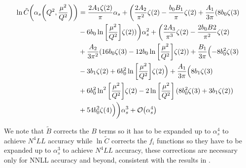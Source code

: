 \documentclass[../main.tex]{subfiles}
\begin{document}

\begin{align}
    \begin{split}
    \ln \tilde{C}\qty(\alpha_s \qty(Q^2, \frac{\mu^2}{Q^2})) &= \frac{2 A_1 \zeta(2)}{\pi} \alpha_s + \biggl(\frac{2 A_2}{\pi^2} \zeta(2) - \frac{b_0 B_1}{\pi} \zeta(2) + \frac{A_1}{3\pi}(8 b_0 \zeta(3) \\
    &- 6 b_0 \ln\qty[\frac{\mu^2}{Q^2}] \zeta(2))\biggr)\alpha_s^2 + \biggl( \frac{2 A_3}{\pi^3} \zeta(2) - \frac{2 b_0 B2}{\pi^2} \zeta(2) \\
    &+ \frac{A_2}{3 \pi^2} (16 b_0 \zeta(3) - 12 b_0 \ln\qty[\frac{\mu^2}{Q^2}] \zeta(2)) + \frac{B_1}{3 \pi} \Bigl(-8 b_0^2 \zeta(3) \\
    &- 3 b_1 \zeta(2) + 6 b_0^2 \ln\qty[\frac{\mu^2}{Q^2}] \zeta(2)\Bigr) + \frac{A_1}{3 \pi} \Bigl(8 b_1 \zeta(3) \\
    &+  6 b_0^2 \ln^2\qty[\frac{\mu^2}{Q^2}] \zeta(2) - 2 \ln\qty[\frac{\mu^2}{Q^2}] (8 b_0^2 \zeta(3) + 3 b_1 \zeta(2)) \\
    &+ 54 b_0^2 \zeta(4)\Bigr) \biggr)\alpha_s^3 + \order{\alpha_s^4}
    \end{split}
\end{align}

We note that $\tilde{B}$ corrects the $B$ terms so it has to be expanded up to $\alpha_s^4$ to achieve $N^4LL$ accuracy while
$\ln \tilde{C}$ corrects the $f_i$ functions so they have to be expanded up to $\alpha_s^3$ to achieve $N^4LL$ accuracy, 
these corrections are necessary only for NNLL accuracy and beyond, consistent with the results in \cite{CATANI19933}.
\end{document}
